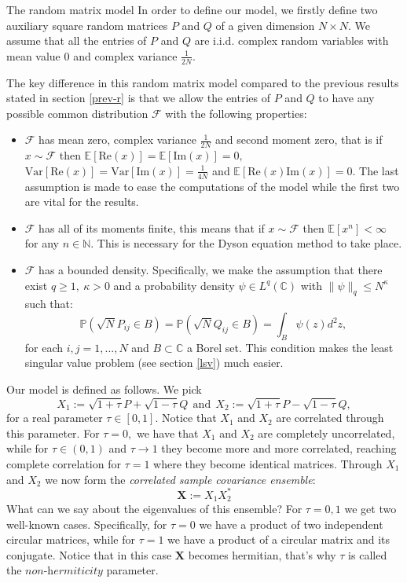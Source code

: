 \documentclass[11pt, a4paper, oneside]{book}
\numberwithin{equation}{chapter}
\newcommand{\E}{\mathbb E}
\newcommand{\beq}{\begin{equation}}
\newcommand{\eeq}{\end{equation}}
\begin{document}
\begin{section}{The random matrix model} \label{s:model}
In order to define our model, we firstly define two auxiliary square random matrices $P$ and $Q$ of a given dimension $N \times N.$ We assume that all the entries of $P$ and $Q$ are i.i.d. complex random variables with mean value $0$ and complex variance $\frac{1}{2N}.$

The key difference in this random matrix model compared to the previous results stated in section \ref{prev-r} is that we allow the entries of $P$ and $Q$ to have any possible common distribution $\mathcal{F}$ with the following properties:
%
\begin{itemize}
    \item \label{a1} $\mathcal{F}$ has mean zero, complex variance $\frac{1}{2N}$ and second moment zero, that is if $x \sim \mathcal{F}$ then $\E[\mathrm{Re} (x)]=\E [\mathrm{Im} (x)] = 0,$ $\mathrm{Var}[\mathrm{Re} (x)] = \mathrm{Var}[\mathrm{Im} (x)]=\frac{1}{4N}$ and $\E[\mathrm{Re} (x) \mathrm{Im} (x)]=0.$ The last assumption is made to ease the computations of the model while the first two are vital for the results.
    
    \item \label{a2} $\mathcal{F}$ has all of its moments finite, this means that if $x \sim \mathcal{F}$ then $\E[x^n] < \infty$ for any $n \in \mathbb{N}.$ This is necessary for the Dyson equation method to take place.

    \item \label{a3} $\mathcal{F}$ has a bounded density. Specifically, we make the assumption that there exist $q\geq 1,\ \kappa>0$ and a probability density $\psi \in L^q(\mathbb{C})$ with $\| \psi \|_q \leq N^\kappa$ such that:
    \beq \label{prob-dens}
    \mathbb{P} \left ( \sqrt{N} P_{ij} \in B \right ) = \mathbb{P} \left ( \sqrt{N} Q_{ij} \in B \right ) = \int_B \psi (z) d^2 z,
    \eeq
    for each $i,j=1,...,N$ and $B \subset \mathbb{C}$ a Borel set. This condition makes the least singular value problem (see section \ref{lsv}) much easier.
\end{itemize}
%
Our model is defined as follows. We pick
\beq \label{X1,X2}
    X_1 := \sqrt{1+\tau} P + \sqrt{1-\tau}Q \ \ \text{and} \ \ X_2 := \sqrt{1+\tau} P - \sqrt{1-\tau}Q,
\eeq
%
for a real parameter $\tau \in [0,1].$ Notice that $X_1$ and $X_2$ are correlated through this parameter. For $\tau=0,$ we have that $X_1$ and $X_2$ are completely uncorrelated, while for $\tau \in (0,1)$ and $\tau \to 1$ they become more and more correlated, reaching complete correlation for $\tau=1$ where they become identical matrices. 
%
Through $X_1$ and $X_2$ we now form the \textit{correlated sample covariance ensemble}:
\beq \label{X}
\mathbf{X} := X_1 X_2^*
\eeq
What can we say about the eigenvalues of this ensemble? For $\tau=0,1$ we get two well-known cases. Specifically, for $\tau=0$ we have a product of two independent circular matrices, while for $\tau=1$ we have a product of a circular matrix and its conjugate. Notice that in this case $\mathbf{X}$ becomes hermitian, that's why $\tau$ is called the $\textit{non-hermiticity}$ parameter.


\end{section}
\end{document}
